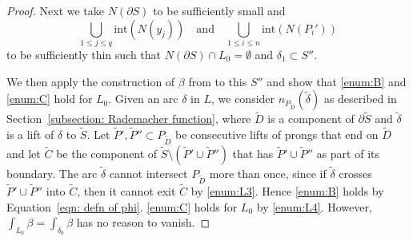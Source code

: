 \documentclass[JEP,XML,SOM,Unicode,NoFloatCountersInSection]{cedram}
\newcommand{\inte}{\mathrm{int}}
\theoremstyle{plain}
\theoremstyle{definition}
\numberwithin{equation}{subsection}
\newcommand{\bdry}{\partial}
\begin{document}
\begin{proof}
Next we take $N(\bdry S)$ to be sufficiently small and
\[
\bigcup_{1\leq j\leq q} \inte(N(y_j))\quad\text{and}\quad\bigcup_{1\leq i\leq n} \inte(N(P_i'))
\]
to be sufficiently thin such that $N(\partial S)\cap L_0 =\emptyset$ and $\delta_1 \subset S''$.

We then apply the construction of $\beta$ from \cite[Prop.\,6.3]{CH2} to this $S''$ and show that \eqref{enum:B} and \eqref{enum:C} hold for $L_0$. Given an arc $\delta$ in $L$, we consider $n_{P_{\widetilde D}}(\widetilde \delta)$ as described in Section~\ref{subsection: Rademacher function}, where $\widetilde D$ is a component of $\bdry\widetilde S$ and $\widetilde \delta$ is a lift of $\delta$ to $\widetilde S$. Let $\widetilde P', \widetilde P''\subset P_{\widetilde D}$ be consecutive lifts of prongs that end on $\widetilde D$ and let $\widetilde C$ be the component of $\widetilde S\setminus(\widetilde P'\cup \widetilde P'')$ that has $\widetilde P'\cup \widetilde P''$ as part of its boundary. The arc $\widetilde \delta$ cannot intersect $P_{\widetilde D}$ more than once, since if $\widetilde \delta$ crosses $\widetilde P'\cup \widetilde P''$ into $\widetilde C$, then it cannot exit $\widetilde C$ by \eqref{enum:L3}. Hence \eqref{enum:B} holds by Equation~\eqref{eqn: defn of phi}. \eqref{enum:C} holds for $L_0$ by \eqref{enum:L4}. However, $\int_{L_0} \beta =\int_{\delta_{0}} \beta$ has no reason to vanish.


\end{proof}
\end{document}
